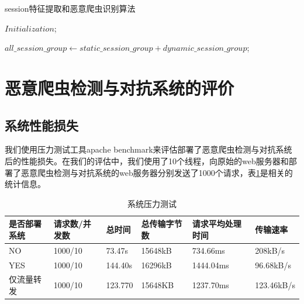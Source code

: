 \documentclass[doctor,privacy,twoside]{buaa_mac}
\begin{document}
\begin{algorithm}[!h]
  \caption{session特征提取和恶意爬虫识别算法}

$Initialization$;
 
$all\_{}session\_{}group  \leftarrow static\_{}session\_{}group +  dynamic\_{}session\_{}group$; \\

\end{algorithm}


\section{恶意爬虫检测与对抗系统的评价}

\subsection{系统性能损失}
我们使用压力测试工具apache benchmark来评估部署了恶意爬虫检测与对抗系统后的性能损失。在我们的评估中，我们使用了10个线程，向原始的web服务器和部署了恶意爬虫检测与对抗系统的web服务器分别发送了1000个请求，表\ref{tab:pressure}是相关的统计信息。

\begin{table}[h]
  \caption{系统压力测试}
  \label{tab:pressure}
  \centering
\begin{tabular}{|p{2cm}<{\centering}||p{2cm}<{\centering}|p{2cm}<{\centering}|p{2cm}<{\centering}|p{2cm}<{\centering}|p{2cm}<{\centering}|}
    \hline
   是否部署系统 &  请求数/并发数  & 总时间  &  总传输字节数  & 请求平均处理时间  &  传输速率  \\
    \hline
NO     &      1000/10  &    73.47s   &  15648kB  &    734.66ms   &   208kB/s \\
YES     &     1000/10  &     144.40s &  16296kB   &  1444.04ms    &  96.68kB/s\\
仅流量转发 &    1000/10 &     123.770  & 15648KB   &  1237.70ms   &   123.46kB/s \\

\hline
    \end{tabular}
\end{table}
\centerline{}
\end{document}
